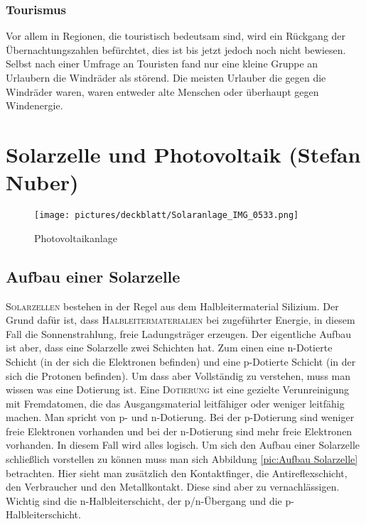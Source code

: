 \documentclass[12pt]{scrbook}
\begin{document}
\subsection{Tourismus}

Vor allem in Regionen, die touristisch bedeutsam sind, wird ein Rückgang der
Übernachtungszahlen befürchtet, dies ist bis jetzt jedoch noch nicht bewiesen.
Selbst nach einer Umfrage an Touristen fand nur eine kleine Gruppe an
Urlaubern die Windräder als störend. Die meisten Urlauber die gegen die
Windräder waren, waren entweder alte Menschen oder überhaupt gegen
Windenergie.

\newpage

\chapter{Solarzelle und Photovoltaik (Stefan Nuber)}

\begin{figure}[htbp] 
  \centering
     \texttt{[image: pictures/deckblatt/Solaranlage\_IMG\_0533.png]}
  \caption{Photovoltaikanlage}
  \label{pic:Photovoltaikanlage}
\end{figure}


\newpage

\section{Aufbau einer Solarzelle}

\textsc{Solarzellen} bestehen in der Regel aus dem Halbleitermaterial Silizium. Der
Grund dafür ist, dass \textsc{Halbleitermaterialien} bei zugeführter Energie, in diesem
Fall die Sonnenstrahlung, freie Ladungsträger erzeugen. Der eigentliche Aufbau
ist aber, dass eine Solarzelle zwei Schichten hat. Zum einen eine n-Dotierte
Schicht (in der sich die Elektronen befinden) und eine p-Dotierte Schicht (in
der sich die Protonen befinden). Um dass aber Vollständig zu verstehen, muss
man wissen was eine Dotierung ist. Eine \textsc{Dotierung} ist eine gezielte
Verunreinigung mit Fremdatomen, die das Ausgangsmaterial leitfähiger oder
weniger leitfähig machen. Man spricht von p- und n-Dotierung. Bei der
p-Dotierung sind weniger freie Elektronen vorhanden und bei der n-Dotierung
sind mehr freie Elektronen vorhanden. In diesem Fall wird alles logisch. Um
sich den Aufbau einer Solarzelle schließlich vorstellen zu können muss man
sich Abbildung \ref{pic:Aufbau Solarzelle} betrachten. Hier sieht man zusätzlich den Kontaktfinger, die
Antireflexschicht, den Verbraucher und den Metallkontakt. Diese sind aber zu
vernachlässigen. Wichtig sind die n-Halbleiterschicht, der p/n-Übergang und
die p-Halbleiterschicht.
\end{document}
